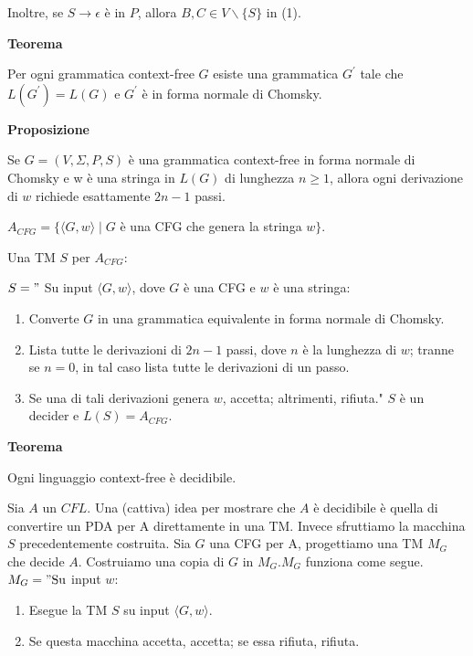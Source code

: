 Inoltre, se $S \rightarrow \epsilon$ è in $P$, allora $B, C \in V \backslash\{S\}$ in (1).

\vspace{5mm}

\textbf{Teorema}

Per ogni grammatica context-free $G$ esiste una grammatica $G^{\prime}$ tale che $L\left(G^{\prime}\right)=L(G)$ e $G^{\prime}$ è in forma normale di Chomsky.

\vspace{5mm}

\textbf{Proposizione}

Se $G=(V, \Sigma, P, S)$ è una grammatica context-free in forma normale di Chomsky e w è una stringa in $L(G)$ di lunghezza $n \geq 1$, allora ogni derivazione di $w$ richiede esattamente $2 n-1$ passi.

\vspace{5mm}

$A_{C F G}=\{\langle G, w\rangle \mid G$ è una CFG che genera la stringa $w\} .$

Una TM $S$ per $A_{C F G}:$

\vspace{5mm}

$S="$ Su input $\langle G, w\rangle$, dove $G$ è una CFG e $w$ è una stringa:
\begin{enumerate}
    \item Converte $G$ in una grammatica equivalente in forma normale di Chomsky.
    \item Lista tutte le derivazioni di $2 n-1$ passi, dove $n$ è la lunghezza di $w$; tranne se $n=0$, in tal caso lista tutte le derivazioni di un passo.
    \item Se una di tali derivazioni genera $w$, accetta; altrimenti, rifiuta."
$S$ è un decider e $L(S)=A_{C F G}$.
\end{enumerate}

\vspace{5mm}

\textbf{Teorema}

Ogni linguaggio context-free è decidibile.

\vspace{5mm}

Sia $A$ un $C F L$. Una (cattiva) idea per mostrare che $A$ è decidibile è quella di convertire un PDA per A direttamente in una TM.
Invece sfruttiamo la macchina $S$ precedentemente costruita. Sia $G$ una CFG per A, progettiamo una TM $M_{G}$ che decide $A$.
Costruiamo una copia di $G$ in $M_{G} . M_{G}$ funziona come segue.
$M_{G}=" \mathrm{Su}$ input $w:$
\begin{enumerate}
    \item Esegue la TM $S$ su input $\langle G, w\rangle$.
    \item Se questa macchina accetta, accetta; se essa rifiuta, rifiuta.
\end{enumerate}

